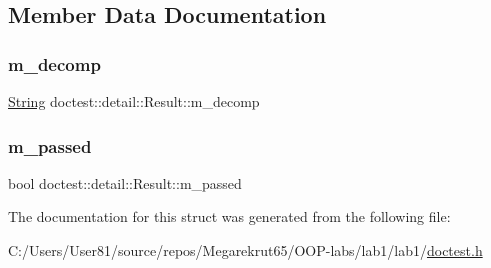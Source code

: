 \subsection{Member Data Documentation}
\mbox{\label{structdoctest_1_1detail_1_1_result_a97968e037266580a799ab3deb9365b79}} 
\subsubsection{\texorpdfstring{m\+\_\+decomp}{m\_decomp}}
{\footnotesize\ttfamily \mbox{\hyperlink{classdoctest_1_1_string}{String}} doctest\+::detail\+::\+Result\+::m\+\_\+decomp}

\mbox{\label{structdoctest_1_1detail_1_1_result_a03ff571186856a429ada967ddfdf3006}} 
\subsubsection{\texorpdfstring{m\+\_\+passed}{m\_passed}}
{\footnotesize\ttfamily bool doctest\+::detail\+::\+Result\+::m\+\_\+passed}



The documentation for this struct was generated from the following file\+:\begin{DoxyCompactItemize}
\item 
C\+:/\+Users/\+User81/source/repos/\+Megarekrut65/\+O\+O\+P-\/labs/lab1/lab1/\mbox{\hyperlink{doctest_8h}{doctest.\+h}}\end{DoxyCompactItemize}
